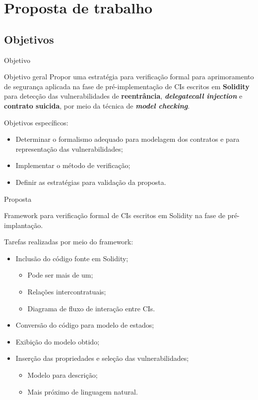 \section{Proposta de trabalho}
\subsection{Objetivos}
\begin{frame}{Objetivo}
    \begin{block}{Objetivo geral}
    Propor uma estratégia para verificação formal para aprimoramento de segurança aplicada na fase de pré-implementação de CIs escritos em \textbf{Solidity} para detecção das vulnerabilidades de \textbf{reentrância}, \textbf{\textit{delegatecall injection}} e \textbf{contrato suicida}, por meio da técnica de \textbf{\textit{model checking}}.
    \end{block}
    Objetivos específicos:
    \begin{itemize}
        \item Determinar o formalismo adequado para modelagem dos contratos e para representação das vulnerabilidades;
        \item Implementar o método de verificação;
        \item Definir as estratégias para validação da proposta.
    \end{itemize}
\end{frame}

\begin{frame}{Proposta}
    \begin{block}{}
    Framework para verificação formal de CIs escritos em Solidity na fase de pré-implantação.
    \end{block}
    Tarefas realizadas por meio do framework:
    \begin{itemize}
        \item Inclusão do código fonte em Solidity;
        \begin{itemize}
            \item Pode ser mais de um;
            \item Relações intercontratuais;
            \item Diagrama de fluxo de interação entre CIs.
        \end{itemize}
        \item Conversão do código para modelo de estados;
        \item Exibição do modelo obtido;
        \item Inserção das propriedades e seleção das vulnerabilidades;
        \begin{itemize}
            \item Modelo para descrição;
            \item Mais próximo de linguagem natural.
        \end{itemize}
    \end{itemize}
\end{frame}

